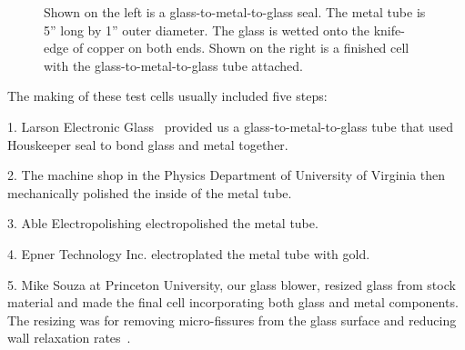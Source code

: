 \begin{figure}[t!]
	\centering
	\caption{{Shown on the left is a glass-to-metal-to-glass seal. The metal tube is 5'' long by 1'' outer diameter. The glass is wetted onto the knife-edge of copper on both ends. Shown on the right is a finished cell with the glass-to-metal-to-glass tube attached.}}
	\label{metal_tube}
\end{figure}

The making of these test cells usually included five steps:

1. Larson Electronic Glass~\cite{Larson} provided us a glass-to-metal-to-glass tube that used Houskeeper seal to bond glass and metal together.

2. The machine shop in the Physics Department of University of Virginia then mechanically polished the inside of the metal tube.

3. Able\cite{Able} Electropolishing electropolished the metal tube.

4. Epner\cite{Epner} Technology Inc. electroplated the metal tube with gold.

5. Mike Souza at Princeton University, our glass blower, resized glass from stock material and made the final cell incorporating both glass and metal components. The resizing was for removing micro-fissures from the glass surface and reducing wall relaxation rates~\cite{Cates1993}.

